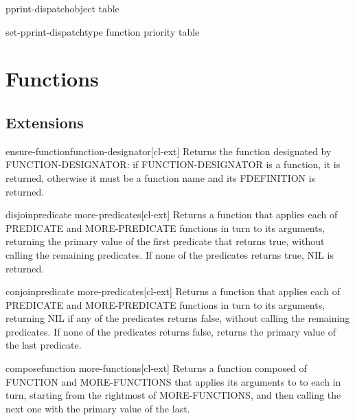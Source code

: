 \documentclass[10pt,english]{book}
\begin{document}
\begin{function}{pprint-dispatch}{object \op table}
  
\end{function}

\begin{function}{set-pprint-dispatch}{type function \op priority table}
  
\end{function}


\chapter{Functions}

\section{Extensions}
\label{sec:fun-extensions}

\begin{function}{ensure-function}{function-designator}[cl-ext]
  Returns the function designated by FUNCTION-DESIGNATOR:
if FUNCTION-DESIGNATOR is a function, it is returned, otherwise
it must be a function name and its FDEFINITION is returned.
\end{function}

\begin{function}{disjoin}{predicate \rest more-predicates}[cl-ext]
  Returns a function that applies each of PREDICATE and MORE-PREDICATE
functions in turn to its arguments, returning the primary value of the first
predicate that returns true, without calling the remaining predicates.
If none of the predicates returns true, NIL is returned.
\end{function}

\begin{function}{conjoin}{predicate \rest more-predicates}[cl-ext]
  Returns a function that applies each of PREDICATE and MORE-PREDICATE
functions in turn to its arguments, returning NIL if any of the predicates
returns false, without calling the remaining predicates. If none of the
predicates returns false, returns the primary value of the last predicate.
\end{function}

\begin{function}{compose}{function \rest more-functions}[cl-ext]
  Returns a function composed of FUNCTION and MORE-FUNCTIONS that applies its
arguments to to each in turn, starting from the rightmost of MORE-FUNCTIONS,
and then calling the next one with the primary value of the last.
\end{function}
\end{document}

